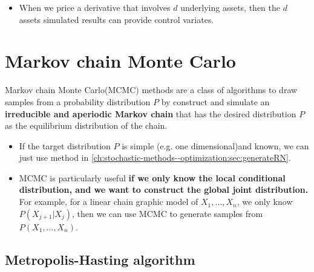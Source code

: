 \begin{refsection}
\begin{example}\hfill
	\begin{itemize}
		\item When we price a derivative that involves $d$ underlying assets, then the $d$ assets simulated results can provide control variates. 
	\end{itemize}	
	
\end{example}










\section{Markov chain Monte Carlo }


\begin{definition}
	Markov chain Monte Carlo(MCMC) methods are a class of algorithms to draw samples from a probability distribution $P$ by construct and simulate an \textbf{irreducible and aperiodic Markov chain} that has the  desired distribution $P$ as the equilibrium distribution of the chain.   
\end{definition}

\begin{remark}[interpretation]\hfill
	\begin{itemize}
		\item If the target distribution $P$ is simple (e.g. one dimensional)and known, we can just use method in \autoref{ch:stochastic-methods--optimization:sec:generateRN}.
		\item MCMC is particularly useful \textbf{if we only know the local conditional distribution, and we want to construct the global joint distribution.} For example, for a linear chain graphic model of $X_1,...,X_n$, we only know $P(X_{j+1}|X_j)$, then we can use MCMC to generate samples from $P(X_1,...,X_n)$.  
	\end{itemize}
\end{remark}

\subsection{Metropolis-Hasting algorithm}


\end{refsection}
